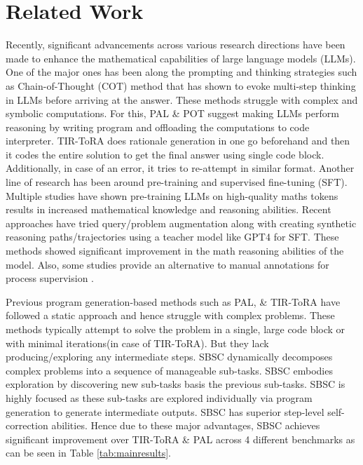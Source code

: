 \section{Related Work}
\label{related_work}

Recently, significant advancements across various research directions have been made to enhance the mathematical capabilities of large language models (LLMs). One of the major ones has been along the prompting and thinking strategies such as Chain-of-Thought (COT) method \citep{Wei2022ChainOT, Kojima2022LargeLM} that has shown to evoke multi-step thinking in LLMs before arriving at the answer. These methods struggle with complex and symbolic computations. For this, PAL \citep{Gao2022PALPL} \& POT \citep{Chen2022ProgramOT} suggest making LLMs perform reasoning by writing program and offloading the computations to code interpreter. TIR-ToRA \citep{Gou2023ToRAAT} does rationale generation in one go beforehand and then it codes the entire solution to get the final answer using single code block. Additionally, in case of an error, it tries to re-attempt in similar format. Another line of research has been around pre-training and supervised fine-tuning (SFT). Multiple studies \citep{Shao2024DeepSeekMathPT, Ying2024InternLMMathOM, DeepSeekAI2024DeepSeekCoderV2BT, Azerbayev2023LlemmaAO, Lewkowycz2022SolvingQR, Paster2023OpenWebMathAO, Taylor2022GalacticaAL} have shown pre-training LLMs on high-quality maths tokens results in increased mathematical knowledge and reasoning abilities. Recent approaches \citep{Yu2023MetaMathBY, Gou2023ToRAAT, Yue2023MAmmoTHBM, Wang2023MathCoderSC, Shao2024DeepSeekMathPT, Toshniwal2024OpenMathInstruct1A1, Mitra2024OrcaMathUT, numina_math_7b, Yin2024MuMathCodeCT, Tong2024DARTMathDR} have tried query/problem augmentation along with creating synthetic reasoning paths/trajectories using a teacher model like GPT4 \citep{Achiam2023GPT4TR} for SFT. These methods showed significant improvement in the math reasoning abilities of the model.  Also, some studies \citep{Wang2023MathShepherdVA, Yu2023OVMOV, Xi2024TrainingLL, Chen2024AlphaMathAZ, Lightman2023LetsVS} provide an alternative to manual annotations for process supervision \citep{lightman2023letsverifystepstep}.
      
Previous program generation-based methods such as PAL, \& TIR-ToRA have followed a static approach and hence struggle with complex problems. These methods typically attempt to solve the problem in a single, large code block or with minimal iterations(in case of TIR-ToRA). But they lack producing/exploring any intermediate steps. 
SBSC dynamically decomposes complex problems into a sequence of manageable sub-tasks. SBSC embodies exploration by discovering new sub-tasks basis the previous sub-tasks. SBSC is highly focused as these sub-tasks are explored individually via program generation to generate intermediate outputs. SBSC has superior step-level self-correction abilities. Hence due to these major advantages, SBSC achieves significant improvement over TIR-ToRA \& PAL across 4 different benchmarks as can be seen in Table \ref{tab:mainresults}.